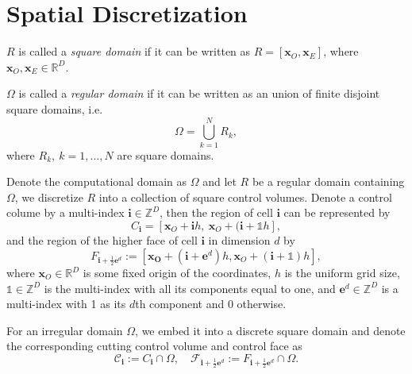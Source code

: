\section{Spatial Discretization}
\label{sec:SpatialDiscretization}

\begin{defn}
  $R$ is called a \emph{square domain} if it can be written as
  $R=[\mathbf{x}_O,\mathbf{x}_E]$, where
  $\mathbf{x}_O,\mathbf{x}_E\in\mathbb{R}^D$.
\end{defn}
\begin{defn}
  $\Omega$ is called a \emph{regular domain} if it can be written as an
  union of finite disjoint square domains, i.e.
  \begin{equation}
    \Omega = \bigcup\limits_{k=1}^NR_k,
  \end{equation}
  where $R_k,\ k=1,\ldots,N$ are square domains.
\end{defn}

Denote the computational domain as $\Omega$ and  let $R$ be a regular domain
containing $\Omega$, we discretize $R$ into a
collection of square control volumes. Denote a control colume by a multi-index
$\mathbf{i}\in \mathbb{Z}^D$, then the region of cell $\mathbf{i}$ can be
represented by
\begin{equation}
  \label{eq:Ci}
  C_{\mathbf{i}}=\left[\mathbf{x}_O+\mathbf{i}h,\
    \mathbf{x}_O+(\mathbf{i}+\mathds{1}h\right],
\end{equation}
and the region of the higher face of cell $\mathbf{i}$ in dimension
$d$ by
\begin{equation}
  \label{eq:Fi}
  F_{\mathbf{i}+\frac{1}{2}\mathbf{e}^d}  :=
  \left[ \mathbf{\mathbf{x}_O} + \left(\mathbf{i}+\mathbf{e}^d \right)
    h, \mathbf{x}_O
    +\left(\mathbf{i}+\mathds{1}\right)h \right],
\end{equation}
where $\mathbf{x}_O\in\mathbb{R}^D$ is some fixed origin of the
coordinates, $h$ is the uniform grid size, $\mathds{1}\in\mathbb{Z}^D$
is the multi-index with all its components equal to one, and
$\mathbf{e}^d\in\mathbb{Z}^D$ is a multi-index with 1 as its $d$th
component and 0 otherwise.

For an irregular domain $\Omega$, we embed it into a discrete square
domain and  denote the corresponding cutting control volume and
control face as
\begin{equation}
  \mathcal{C}_{\mathbf{i}}:={C}_{\mathbf{i}}\cap \Omega,\quad
  \mathcal{F}_{\mathbf{i}+\frac{1}{2}\mathbf{e}^d} :=
  {F}_{\mathbf{i}+\frac{1}{2}\mathbf{e}^d}  \cap \Omega.
\end{equation}

